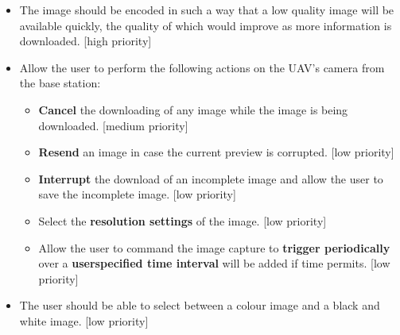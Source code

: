 \begin{itemize}
	\item The image should be encoded in such a way that a low quality image will be available quickly, the quality of which would improve as more information is downloaded. [high priority]
	\item Allow the user to perform the following actions on the UAV’s camera from the base station:
	\begin{itemize}
		\item \textbf{Cancel} the downloading of any image while the image is being downloaded. [medium priority]
		\item \textbf{Resend} an image in case the current preview is corrupted. [low priority]
		\item \textbf{Interrupt} the download of an incomplete image and allow the user to save the incomplete image. [low priority]
		\item Select the \textbf{resolution settings} of the image. [low priority]
		\item Allow the user to command the image capture to \textbf{trigger periodically} over a \textbf{userspecified time interval} will be added if time permits. [low priority]
	\end{itemize}
	\item The user should be able to select between a colour image and a black and white image. [low priority]
\end{itemize}
